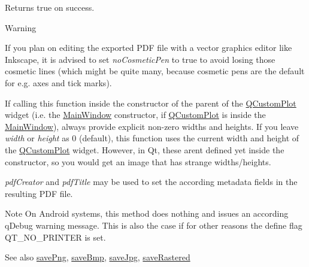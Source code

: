 Returns true on success.

\begin{DoxyWarning}{Warning}
\begin{DoxyItemize}
\item If you plan on editing the exported P\+DF file with a vector graphics editor like Inkscape, it is advised to set {\itshape no\+Cosmetic\+Pen} to true to avoid losing those cosmetic lines (which might be quite many, because cosmetic pens are the default for e.\+g. axes and tick marks). \item If calling this function inside the constructor of the parent of the \hyperlink{classQCustomPlot}{Q\+Custom\+Plot} widget (i.\+e. the \hyperlink{classMainWindow}{Main\+Window} constructor, if \hyperlink{classQCustomPlot}{Q\+Custom\+Plot} is inside the \hyperlink{classMainWindow}{Main\+Window}), always provide explicit non-\/zero widths and heights. If you leave {\itshape width} or {\itshape height} as 0 (default), this function uses the current width and height of the \hyperlink{classQCustomPlot}{Q\+Custom\+Plot} widget. However, in Qt, these aren\textquotesingle{}t defined yet inside the constructor, so you would get an image that has strange widths/heights.\end{DoxyItemize}
{\itshape pdf\+Creator} and {\itshape pdf\+Title} may be used to set the according metadata fields in the resulting P\+DF file.
\end{DoxyWarning}
\begin{DoxyNote}{Note}
On Android systems, this method does nothing and issues an according q\+Debug warning message. This is also the case if for other reasons the define flag Q\+T\+\_\+\+N\+O\+\_\+\+P\+R\+I\+N\+T\+ER is set.
\end{DoxyNote}
\begin{DoxySeeAlso}{See also}
\hyperlink{classQCustomPlot_a7636261aff1f6d25c9da749ece3fc8b8}{save\+Png}, \hyperlink{classQCustomPlot_a6629d9e8e6da4bf18055ee0257fdce9a}{save\+Bmp}, \hyperlink{classQCustomPlot_a490c722092d1771e8ce4a7a73dfd84ab}{save\+Jpg}, \hyperlink{classQCustomPlot_ab528b84cf92baabe29b1d0ef2f77c93e}{save\+Rastered} 
\end{DoxySeeAlso}
